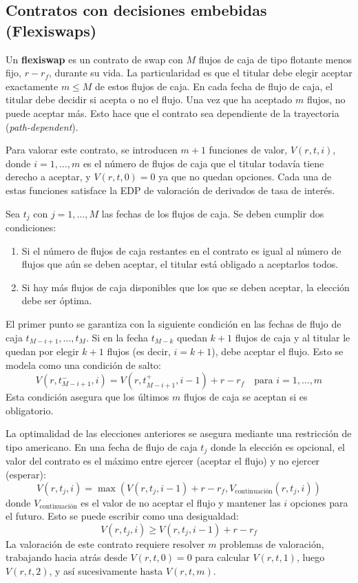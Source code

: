 \subsection{Contratos con decisiones embebidas (Flexiswaps)}

Un \textbf{flexiswap} es un contrato de swap con $M$ flujos de caja de tipo flotante menos fijo, $r - r_f$, durante su vida. La particularidad es que el titular debe elegir aceptar exactamente $m \leq M$ de estos flujos de caja. En cada fecha de flujo de caja, el titular debe decidir si acepta o no el flujo. Una vez que ha aceptado $m$ flujos, no puede aceptar más. Esto hace que el contrato sea dependiente de la trayectoria (\textit{path-dependent}).

Para valorar este contrato, se introducen $m+1$ funciones de valor, $V(r, t, i)$, donde $i = 1, \dots, m$ es el número de flujos de caja que el titular todavía tiene derecho a aceptar, y $V(r, t, 0) = 0$ ya que no quedan opciones. Cada una de estas funciones satisface la EDP de valoración de derivados de tasa de interés.

Sea $t_j$ con $j=1, \dots, M$ las fechas de los flujos de caja. Se deben cumplir dos condiciones:
\begin{enumerate}
    \item Si el número de flujos de caja restantes en el contrato es igual al número de flujos que aún se deben aceptar, el titular está obligado a aceptarlos todos.
    \item Si hay más flujos de caja disponibles que los que se deben aceptar, la elección debe ser óptima.
\end{enumerate}

El primer punto se garantiza con la siguiente condición en las fechas de flujo de caja $t_{M-i+1}, \dots, t_M$. Si en la fecha $t_{M-k}$ quedan $k+1$ flujos de caja y al titular le quedan por elegir $k+1$ flujos (es decir, $i=k+1$), debe aceptar el flujo. Esto se modela como una condición de salto:
\begin{equation*}
    V(r, t_{M-i+1}^-, i) = V(r, t_{M-i+1}^+, i-1) + r - r_f \quad \text{para } i=1, \dots, m
\end{equation*}
Esta condición asegura que los últimos $m$ flujos de caja se aceptan si es obligatorio.

La optimalidad de las elecciones anteriores se asegura mediante una restricción de tipo americano. En una fecha de flujo de caja $t_j$ donde la elección es opcional, el valor del contrato es el máximo entre ejercer (aceptar el flujo) y no ejercer (esperar):
\begin{equation*}
    V(r, t_j, i) = \max\left( V(r, t_j, i-1) + r - r_f, V_{\text{continuación}}(r, t_j, i) \right)
\end{equation*}
donde $V_{\text{continuación}}$ es el valor de no aceptar el flujo y mantener las $i$ opciones para el futuro. Esto se puede escribir como una desigualdad:
\begin{equation*}
    V(r, t_j, i) \geq V(r, t_j, i-1) + r - r_f
\end{equation*}
La valoración de este contrato requiere resolver $m$ problemas de valoración, trabajando hacia atrás desde $V(r,t,0)=0$ para calcular $V(r,t,1)$, luego $V(r,t,2)$, y así sucesivamente hasta $V(r,t,m)$.

